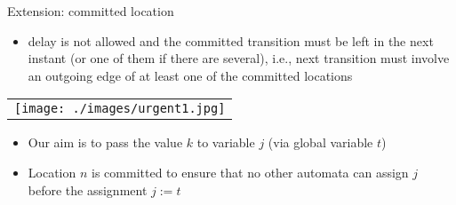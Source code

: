 \documentclass{beamer}
\def\dkb#1{{\blue #1}}
\begin{document}
\begin{slide}{Extension: committed location}
\small

\begin{itemize}
\item delay is not allowed and the committed transition must be left in the next instant (or one of them if there are several), i.e., 
next transition must involve an outgoing edge of at least one of the committed locations
\end{itemize} 

\begin{tabular}{c}
   \texttt{[image: ./images/urgent1.jpg]} 
\end{tabular}

\begin{itemize}
\item Our aim is to pass the value $k$ to variable $j$ (via global variable $t$)
\item Location $n$ is \dkb{committed} to ensure that no other automata can assign $j$ before
the assignment $j:=t$
\end{itemize}

\end{slide}
\end{document}
